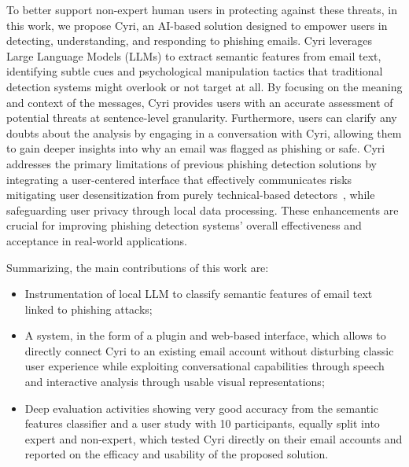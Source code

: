 To better support non-expert human users in protecting against these threats, in this work, we propose Cyri, an AI-based solution designed to empower users in detecting, understanding, and responding to phishing emails. Cyri leverages Large Language Models (LLMs) to extract semantic features from email text, identifying subtle cues and psychological manipulation tactics that traditional detection systems might overlook or not target at all. By focusing on the meaning and context of the messages, Cyri provides users with an accurate assessment of potential threats at sentence-level granularity. Furthermore, users can clarify any doubts about the analysis by engaging in a conversation with Cyri, allowing them to gain deeper insights into why an email was flagged as phishing or safe. Cyri addresses the primary limitations of previous phishing detection solutions by integrating a user-centered interface that effectively communicates risks mitigating user desensitization from purely technical-based detectors~\cite{b22, b23}, while safeguarding user privacy through local data processing. These enhancements are crucial for improving phishing detection systems' overall effectiveness and acceptance in real-world applications.

Summarizing, the main contributions of this work are:
\begin{itemize}
    \item Instrumentation of local LLM to classify semantic features of email text linked to phishing attacks;
    \item A system, in the form of a plugin and web-based interface, which allows to directly connect Cyri to an existing email account without disturbing classic user experience while exploiting conversational capabilities through speech and interactive analysis through usable visual representations;
    \item Deep evaluation activities showing very good accuracy from the semantic features classifier and a user study with 10 participants, equally split into expert and non-expert, which tested Cyri directly on their email accounts and reported on the efficacy and usability of the proposed solution.
\end{itemize}


